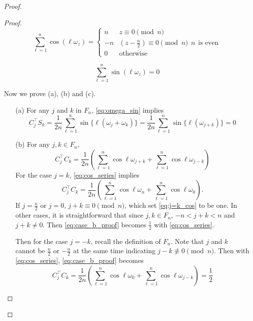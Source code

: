 \begin{proof}
\begin{lem}
\begin{proof}
\begin{equation}
\label{eq:omega_cos}
\sum_{\ell=1}^n \cos(\ell\omega_z) = 
\begin{cases}
n & z\equiv 0\pmod{n} \\
-n & (z -\frac{n}{2}) \equiv 0\pmod{n} ~~n ~~\text{is even}\\
0  & \text{otherwise}
\end{cases}
\end{equation}


\begin{equation}
\label{eq:omega_sin}
\sum_{\ell=1}^n \sin(\ell\omega_z) = 0
\end{equation}

\par
Now we prove (a), (b) and (c).

\begin{enumerate}
\item[(a)] For any $j$ and $k$ in $F_n$, \eqref{eq:omega_sin} implies
\begin{equation}
\label{eq:case_a_proof}
C_j^\top S_k = \frac{1}{2n}\sum_{\ell=1}^n \sin\{\ell (\omega_j+\omega_k)\} = \frac{1}{2n}\sum_{\ell=1}^n \sin\{\ell (\omega_{j+k})\} = 0
\end{equation}
\item[(b)] For any $j,k\in F_n$, 
\begin{equation}
\label{eq:case_b_proof}
C_j^\top C_k = \frac{1}{2n}\left(\sum_{\ell=1}^n \cos \ell\omega_{j+k} + \sum_{\ell=1}^n \cos \ell\omega_{j-k}\right)
\end{equation}
For the case $j=k$, \eqref{eq:cos_series} implies
\begin{equation}
\label{eq:j=k_cos}
C_j^\top C_k = \frac{1}{2n} \left(\sum_{\ell=1}^n\cos \ell\omega_{n} + \sum_{\ell=1}^n \cos \ell\omega_{0}\right).
\end{equation}
If $j = \frac{n}{2}$ or $j=0$, $j+k\equiv 0 \pmod{n}$, which set \eqref{eq:j=k_cos} to be one. In other cases, it is straightforward that since $j,k\in F_n$, $-n<j+k<n$ and $j+k\neq 0$. Then \eqref{eq:case_b_proof} becomes $\frac{1}{2}$ with \eqref{eq:cos_series}. \par 
Then for the case $j=-k$, recall the definition of $F_n$. Note that $j$ and $k$ cannot be $\frac{n}{2}$ or $-\frac{n}{2}$ at the same time indicating $j-k \not \equiv 0 \pmod{n}$. Then with \eqref{eq:cos_series}, \eqref{eq:case_b_proof} becomes 
\begin{equation}
C_j^\top C_k = \frac{1}{2n}\left(\sum_{\ell=1}^n \cos \ell\omega_{0} + \sum_{\ell=1}^n \cos \ell\omega_{j-k}\right) = \frac{1}{2}

\end{equation}
\end{enumerate}
\end{proof}
\end{lem}
\end{proof}
